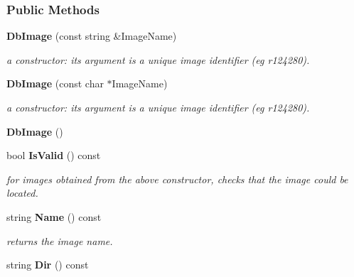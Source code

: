 \subsubsection*{Public Methods}
\begin{CompactItemize}
\item 
{}
{\bf Db\-Image} (const string \&Image\-Name)\label{class_dbimage_a0}

\begin{CompactList}\small\item\em a constructor: its argument is a unique image identifier (eg r124280).\item\end{CompactList}\item 
{}
{\bf Db\-Image} (const char $\ast$Image\-Name)\label{class_dbimage_a1}

\begin{CompactList}\small\item\em a constructor: its argument is a unique image identifier (eg r124280).\item\end{CompactList}\item 
{}
{\bf Db\-Image} ()\label{class_dbimage_a2}

\item 
{}
bool {\bf Is\-Valid} () const\label{class_dbimage_a3}

\begin{CompactList}\small\item\em for images obtained from the above constructor, checks that the image could be located.\item\end{CompactList}\item 
{}
string {\bf Name} () const\label{class_dbimage_a4}

\begin{CompactList}\small\item\em returns the image name.\item\end{CompactList}\item 
{}
string {\bf Dir} () const\label{class_dbimage_a5}


\end{CompactItemize}
